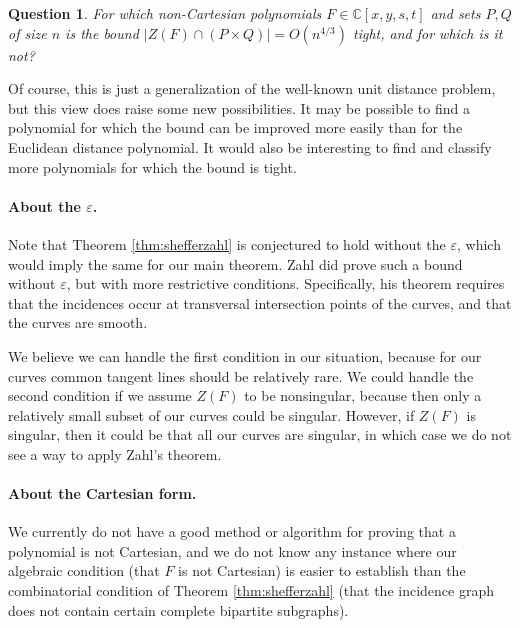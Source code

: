 \documentclass{daj}
\newtheorem{question}[theorem]{Question}
\theoremstyle{definition}
\newcommand{\C}{\mathbb C}
\newcommand{\eps}{\varepsilon}
\begin{document}
\begin{question}
For which non-Cartesian polynomials $F\in \C[x,y,s,t]$ and sets $P,Q$ of size $n$ is the bound $|Z(F)\cap (P\times Q)| = O(n^{4/3})$ tight, 
and for which is it not?
\end{question}

Of course, this is just a generalization of the well-known unit distance problem,
but this view does raise some new possibilities.
It may be possible to find a polynomial for which the bound can be improved more easily than for the Euclidean distance polynomial.
It would also be interesting to find and classify more polynomials for which the bound is tight.



\paragraph{About the $\eps$.}
Note that Theorem \ref{thm:shefferzahl} is conjectured to hold without the $\eps$, which would imply the same for our main theorem.
Zahl \cite{Z} did prove such a bound without $\eps$, but with more restrictive conditions.
Specifically, his theorem requires that the incidences occur at  transversal intersection points of the curves, and that the curves are smooth.

We believe we can handle the first condition in our situation, because for our curves common tangent lines should be relatively rare.
We could handle the second condition if we assume $Z(F)$ to be nonsingular, because then only a relatively small subset of our curves could be singular.
However, if $Z(F)$ is singular, then it could be that all our curves are singular, in which case we do not see a way to apply Zahl's theorem.


\paragraph{About the Cartesian form.}
We currently do not have a good method or algorithm for proving that a polynomial is not Cartesian, and we do not know any instance where our algebraic condition (that $F$ is not Cartesian) is easier to establish than the combinatorial condition of Theorem \ref{thm:shefferzahl} (that the incidence graph does not contain certain complete bipartite subgraphs).
\end{document}
